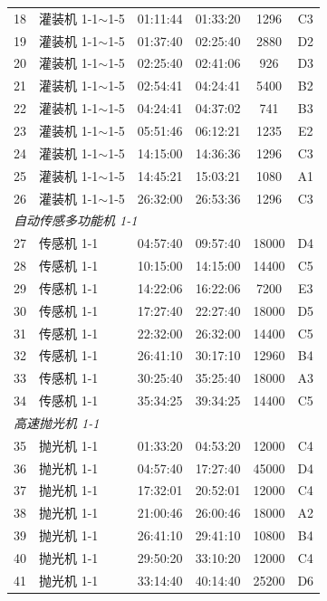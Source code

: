\documentclass[12pt,a4paper]{ctexart}
\begin{document}
\begin{longtable}{c p{4.6cm} c c c c}
18 & 灌装机 1-1$\sim$1-5 & 01:11:44 & 01:33:20 & 1296 & C3 \\
19 & 灌装机 1-1$\sim$1-5 & 01:37:40 & 02:25:40 & 2880 & D2 \\
20 & 灌装机 1-1$\sim$1-5 & 02:25:40 & 02:41:06 & 926 & D3 \\
21 & 灌装机 1-1$\sim$1-5 & 02:54:41 & 04:24:41 & 5400 & B2 \\
22 & 灌装机 1-1$\sim$1-5 & 04:24:41 & 04:37:02 & 741 & B3 \\
23 & 灌装机 1-1$\sim$1-5 & 05:51:46 & 06:12:21 & 1235 & E2 \\
24 & 灌装机 1-1$\sim$1-5 & 14:15:00 & 14:36:36 & 1296 & C3 \\
25 & 灌装机 1-1$\sim$1-5 & 14:45:21 & 15:03:21 & 1080 & A1 \\
26 & 灌装机 1-1$\sim$1-5 & 26:32:00 & 26:53:36 & 1296 & C3 \\
\midrule
\multicolumn{6}{l}{\textit{自动传感多功能机 1-1}}\\
27 & 传感机 1-1 & 04:57:40 & 09:57:40 & 18000 & D4 \\
28 & 传感机 1-1 & 10:15:00 & 14:15:00 & 14400 & C5 \\
29 & 传感机 1-1 & 14:22:06 & 16:22:06 & 7200 & E3 \\
30 & 传感机 1-1 & 17:27:40 & 22:27:40 & 18000 & D5 \\
31 & 传感机 1-1 & 22:32:00 & 26:32:00 & 14400 & C5 \\
32 & 传感机 1-1 & 26:41:10 & 30:17:10 & 12960 & B4 \\
33 & 传感机 1-1 & 30:25:40 & 35:25:40 & 18000 & A3 \\
34 & 传感机 1-1 & 35:34:25 & 39:34:25 & 14400 & C5 \\
\midrule
\multicolumn{6}{l}{\textit{高速抛光机 1-1}}\\
35 & 抛光机 1-1 & 01:33:20 & 04:53:20 & 12000 & C4 \\
36 & 抛光机 1-1 & 04:57:40 & 17:27:40 & 45000 & D4 \\
37 & 抛光机 1-1 & 17:32:01 & 20:52:01 & 12000 & C4 \\
38 & 抛光机 1-1 & 21:00:46 & 26:00:46 & 18000 & A2 \\
39 & 抛光机 1-1 & 26:41:10 & 29:41:10 & 10800 & B4 \\
40 & 抛光机 1-1 & 29:50:20 & 33:10:20 & 12000 & C4 \\
41 & 抛光机 1-1 & 33:14:40 & 40:14:40 & 25200 & D6 \\
\end{longtable}
\end{document}
